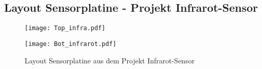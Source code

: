 \documentclass[
	letterpaper, %
	10pt, %
]{CSUniSchoolLabReport}
\begin{document}
\begin{spacing}{1.6}
\subsection{Layout Sensorplatine - Projekt \glqq Infrarot-Sensor\grqq} \label{subsec:Layout_Infrarotsensor}
\begin{figure}[H]
    \begin{minipage}[t]{0.5\textwidth}
        \centering
        \texttt{[image: Top\_infra.pdf]}
    \end{minipage}
    \begin{minipage}[t]{0.5\textwidth}
        \centering
        \texttt{[image: Bot\_infrarot.pdf]}
    \end{minipage}
        \caption{Layout Sensorplatine aus dem Projekt \glqq Infrarot-Sensor\grqq}
        \label{fig:placeholder}
    \end{figure}

\newpage
\printbibliography

\end{spacing}
\end{document}
